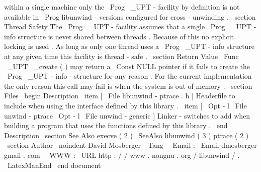 within
a
single
machine
only
the
\
Prog
{
\
_UPT
}
-
facility
by
definition
is
not
available
in
\
Prog
{
libunwind
}
-
versions
configured
for
cross
-
unwinding
.
\
section
{
Thread
Safety
}
The
\
Prog
{
\
_UPT
}
-
facility
assumes
that
a
single
\
Prog
{
\
_UPT
}
-
info
structure
is
never
shared
between
threads
.
Because
of
this
no
explicit
locking
is
used
.
As
long
as
only
one
thread
uses
a
\
Prog
{
\
_UPT
}
-
info
structure
at
any
given
time
this
facility
is
thread
-
safe
.
\
section
{
Return
Value
}
\
Func
{
\
_UPT
\
_create
}
(
)
may
return
a
\
Const
{
NULL
}
pointer
if
it
fails
to
create
the
\
Prog
{
\
_UPT
}
-
info
-
structure
for
any
reason
.
For
the
current
implementation
the
only
reason
this
call
may
fail
is
when
the
system
is
out
of
memory
.
\
section
{
Files
}
\
begin
{
Description
}
\
item
[
\
File
{
libunwind
-
ptrace
.
h
}
]
Headerfile
to
include
when
using
the
interface
defined
by
this
library
.
\
item
[
\
Opt
{
-
l
}
\
File
{
unwind
-
ptrace
}
\
Opt
{
-
l
}
\
File
{
unwind
-
generic
}
]
Linker
-
switches
to
add
when
building
a
program
that
uses
the
functions
defined
by
this
library
.
\
end
{
Description
}
\
section
{
See
Also
}
execve
(
2
)
\
SeeAlso
{
libunwind
(
3
)
}
ptrace
(
2
)
\
section
{
Author
}
\
noindent
David
Mosberger
-
Tang
\
\
Email
:
\
Email
{
dmosberger
gmail
.
com
}
\
\
WWW
:
\
URL
{
http
:
/
/
www
.
nongnu
.
org
/
libunwind
/
}
.
\
LatexManEnd
\
end
{
document
}
